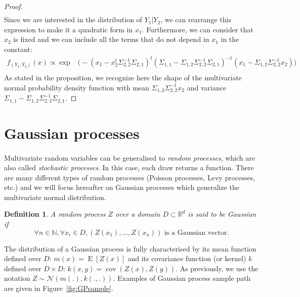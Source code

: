 \documentclass[twoside,openright]{report}
\DeclareMathOperator*{\E}{E}
\DeclareMathOperator*{\Cov}{cov}
\newtheorem{definition}{Definition}
\begin{document}
\begin{proof}
\begin{equation}
\begin{split}
	\end{split}
	\end{equation}
Since we are interested in the distribution of $Y_1 | Y_2$, we can rearrange this expression to make it a quadratic form in $x_1$. Furthermore, we can consider that $x_2$ is fixed and we can include all the terms that do not depend in $x_1$ in the constant:
	\begin{equation}
	\begin{split}
		f_{(Y_1,Y_2)}(x) \propto \exp  & \big(- (x_1 - x_2^t \Sigma_{2,2}^{-1}\Sigma_{2,1})^t (\Sigma_{1,1}-\Sigma_{1,2}\Sigma_{2,2}^{-1}\Sigma_{2,1})^{-1} (x_1- \Sigma_{1,2}\Sigma_{2,2}^{-1} x_2) \big)\\
	\end{split}
	\end{equation}
As stated in the proposition, we recognize here the shape of the multivariate normal probability density function with mean $\Sigma_{1,2}\Sigma_{2,2}^{-1} x_2$ and variance $\Sigma_{1,1}-\Sigma_{1,2}\Sigma_{2,2}^{-1}\Sigma_{2,1}$.
\end{proof}

\section{Gaussian processes}

\paragraph{}
Multivariate random variables can be generalised to \emph{random processes}, which are also called \emph{stochastic processes}. In this case, each draw returns a function. There are many different types of random processes (Poisson processes, Levy processes, etc.) and we will focus hereafter on Gaussian processes which generalize the multivariate normal distribution.

\begin{definition}
A random process $Z$ over a domain $D \subset \mathds{R}^d$ is said to be Gaussian if 
\begin{equation}
\forall n \in \mathds{N}, \forall x_i \in D, (Z(x_1),\dots,Z(x_n)) \text{  is a Gaussian vector}.
\end{equation} 
\end{definition}
The distribution of a Gaussian process is fully characterised by its mean function defined over $D$: $m(x)= \E[Z(x)]$ and its covariance function (or kernel) $k$ defined over $D \times D$: $k(x,y) = \Cov(Z(x),Z(y))$. As previously, we use the notation $Z \sim \mathcal{N}(m(.),k(.,.))$. Examples of Gaussian process sample path are given in Figure~\ref{fig:GPsample}.
\end{document}
